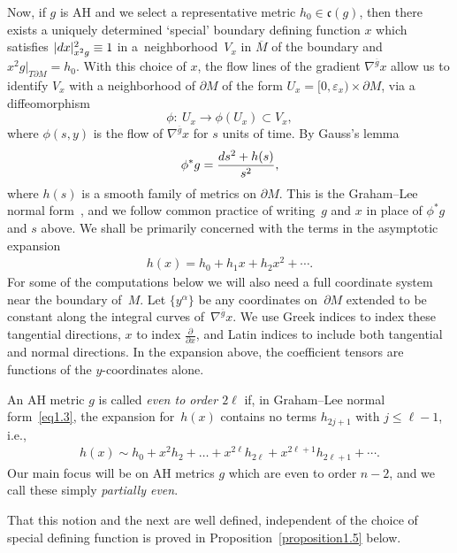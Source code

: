 \documentclass[11pt]{article}
\numberwithin{equation}{section}
\newcommand{\vep}{\varepsilon}
\newcommand{\del}{\partial}
\newcommand{\olg}{\overline{g}}
\newcommand{\frakc}{\mathfrak c}
\newcommand{\Mbar}{\overline{M}}
\begin{document}
Now, if $g$ is AH and we select a representative metric $h_0 \in \frakc(g)$, then there exists a uniquely determined
`special' boundary defining function $x$ which satisfies $|{\rm d}x|^2_{x^2 g} \equiv 1$ in a~neighborhood~$V_x$ in $\Mbar$ of the boundary and $x^2 g|_{T \del M} = h_0$.
With this choice of $x$, the flow lines of the gradient $\nabla^{\olg} x$ allow us to identify $V_x$ with a neighborhood of $\del M$ of the form $U_x = [0,\vep_x) \times \del M$, via a diffeomorphism
\[ \phi\colon \ U_x \longrightarrow \phi(U_x) \subset V_x, \]
where $\phi(s,y)$ is the flow of $\nabla^{\olg} x$ for $s$ units of time. By Gauss's lemma
\begin{gather} \label{eq1.3}
\phi^*g = \frac{{\rm d}s^2 + h(s)}{s^2},
\end{gather}
where $h(s)$ is a smooth family of metrics on $\del M$. This is the Graham--Lee normal form~\cite{GL}, and we follow common practice of writing~$g$ and $x$ in place of $\phi^* g$ and $s$ above. We shall be primarily concerned with the terms in the asymptotic expansion
\begin{gather*}
h(x) = h_0 + h_1 x + h_2 x^2 + \cdots.%
\end{gather*}
For some of the computations below we will also need a full coordinate system near the boundary of~$M$. Let $\{y^{\alpha}\}$ be any coordinates on~$\partial M$ extended to be constant along the integral curves of~$\nabla^{\olg} x$. We use Greek indices to index these tangential directions, $x$ to index $\frac{\partial}{\partial x}$, and Latin indices to include both tangential and normal directions. In the expansion above, the coefficient tensors are functions of the $y$-coordinates alone.

\begin{Definition}\label{definition1.1} \label{def1} An AH metric $g$ is called \emph{even to order $2\ell$} if, in Graham--Lee normal form~\eqref{eq1.3}, the expansion for~$h(x)$ contains no terms $h_{2j+1}$ with $j \leq \ell-1$, i.e.,
\begin{gather*}%
h(x) \sim h_0+x^2h_2 +\dots +x^{2\ell}h_{2\ell} +x^{2\ell+1}h_{2\ell+1}+ \cdots.
\end{gather*}
Our main focus will be on AH metrics $g$ which are even to order $n-2$, and we call these simply \emph{partially even}.
\end{Definition}

That this notion and the next are well defined, independent of the choice of special defining function is proved in Proposition~\ref{proposition1.5} below.
\end{document}
